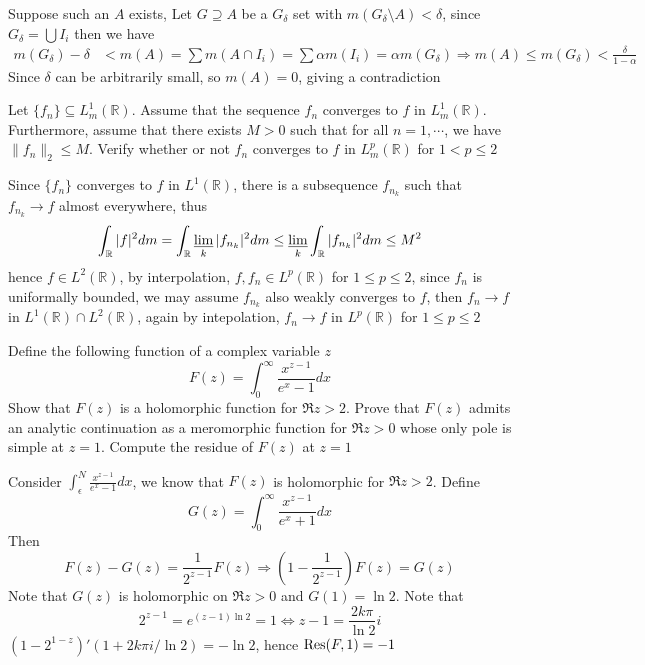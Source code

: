 \documentclass[main]{subfiles}
\begin{document}
\begin{solution}
Suppose such an $A$ exists, Let $G\supseteq A$ be a $G_\delta$ set with $m(G_\delta\setminus A)<\delta$, since $G_\delta=\bigcup I_i$ then we have
\begin{align*}
m(G_\delta)-\delta&<m(A)=\sum m(A\cap I_i)=\sum \alpha m(I_i)=\alpha m(G_\delta)\Rightarrow m(A)\leq m(G_\delta)<\frac{\delta}{1-\alpha}
\end{align*}
Since $\delta$ can be arbitrarily small, so $m(A)=0$, giving a contradiction
\end{solution}

\begin{exercise}
Let $\{f_n\} \subseteq L^1_m(\mathbb R)$. Assume that the sequence $f_n$ converges to $f$ in $L^1_m(\mathbb R)$. Furthermore, assume that there exists $M > 0$ such that for all $n = 1,\cdots$, we have $\|f_n\|_2 \leq M$. Verify whether or not $f_n$ converges to $f$ in $L^p_m(\mathbb R)$ for $1 < p \leq 2$
\end{exercise}

\begin{solution}
Since $\{f_n\}$ converges to $f$ in $L^1(\mathbb R)$, there is a subsequence $f_{n_k}$ such that $f_{n_k}\to f$ almost everywhere, thus
\[\int_{\mathbb R}|f|^2dm=\int_{\mathbb R}\varliminf_k |f_{n_k}|^2dm\leq\varliminf_k\int_{\mathbb R}|f_{n_k}|^2dm\leq M^2\]
hence $f\in L^2(\mathbb R)$, by interpolation, $f,f_n\in L^p(\mathbb R)$ for $1\leq p\leq 2$, since $f_n$ is uniformally bounded, we may assume $f_{n_k}$ also weakly converges to $f$, then $f_n\to f$ in $L^1(\mathbb R)\cap L^2(\mathbb R)$, again by intepolation, $f_n\to f$ in $L^p(\mathbb R)$ for $1\leq p\leq 2$
\end{solution}

\begin{exercise}
Define the following function of a complex variable $z$
\[F(z)=\int_0^\infty\frac{x^{z-1}}{e^x-1}dx\]
Show that $F(z)$ is a holomorphic function for $\Re z > 2$. Prove that $F(z)$ admits an analytic continuation as a meromorphic function for $\Re z > 0$ whose only pole is simple at $z = 1$. Compute the residue of $F(z)$ at $z = 1$
\end{exercise}

\begin{solution}
Consider $\int_\epsilon^N\frac{x^{z-1}}{e^x-1}dx$, we know that $F(z)$ is holomorphic for $\Re z>2$. Define
\[G(z)=\int_0^\infty\frac{x^{z-1}}{e^x+1}dx\]
Then
\[F(z)-G(z)=\frac{1}{2^{z-1}}F(z)\Rightarrow\left(1-\frac{1}{2^{z-1}}\right)F(z)=G(z)\]
Note that $G(z)$ is holomorphic on $\Re z>0$ and $G(1)=\ln2$. Note that
\[2^{z-1}=e^{(z-1)\ln 2}=1\iff z-1=\frac{2k\pi}{\ln2}i\]
$(1-2^{1-z})'(1+2k\pi i/\ln2)=-\ln2$, hence $\operatorname{Res}(F,1)=-1$
\end{solution}
\end{document}
